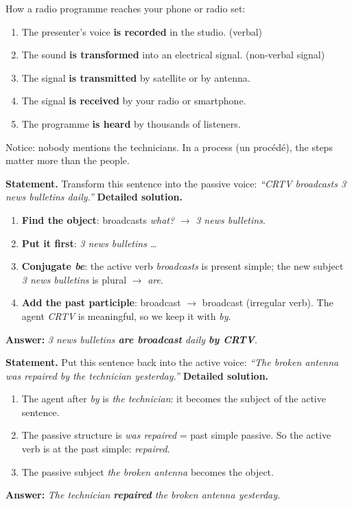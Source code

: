 \documentclass[11pt]{article}
\begin{document}
\begin{exemplebox}
How a radio programme reaches your phone or radio set:
\begin{enumerate}
\item The presenter's voice \textbf{is recorded} in the studio. (verbal)
\item The sound \textbf{is transformed} into an electrical signal. (non-verbal signal)
\item The signal \textbf{is transmitted} by satellite or by antenna.
\item The signal \textbf{is received} by your radio or smartphone.
\item The programme \textbf{is heard} by thousands of listeners.
\end{enumerate}
Notice: nobody mentions the technicians. In a process (un procédé), the steps matter more than the people.
\end{exemplebox}

\begin{exoresolu}
\textbf{Statement.} Transform this sentence into the passive voice: \emph{``CRTV broadcasts 3 news bulletins daily.''}
\tcblower
\textbf{Detailed solution.}
\begin{enumerate}
\item \textbf{Find the object}: broadcasts \emph{what?} $\rightarrow$ \emph{3 news bulletins}.
\item \textbf{Put it first}: \emph{3 news bulletins \ldots}
\item \textbf{Conjugate \emph{be}}: the active verb \emph{broadcasts} is present simple; the new subject \emph{3 news bulletins} is plural $\rightarrow$ \emph{are}.
\item \textbf{Add the past participle}: broadcast $\rightarrow$ broadcast (irregular verb). The agent \emph{CRTV} is meaningful, so we keep it with \emph{by}.
\end{enumerate}
\textbf{Answer:} \emph{3 news bulletins \textbf{are broadcast} daily \textbf{by CRTV}.}
\end{exoresolu}

\begin{exoresolu}
\textbf{Statement.} Put this sentence back into the active voice: \emph{``The broken antenna was repaired by the technician yesterday.''}
\tcblower
\textbf{Detailed solution.}
\begin{enumerate}
\item The agent after \emph{by} is \emph{the technician}: it becomes the subject of the active sentence.
\item The passive structure is \emph{was repaired} = past simple passive. So the active verb is at the past simple: \emph{repaired}.
\item The passive subject \emph{the broken antenna} becomes the object.
\end{enumerate}
\textbf{Answer:} \emph{The technician \textbf{repaired} the broken antenna yesterday.}
\end{exoresolu}
\end{document}
